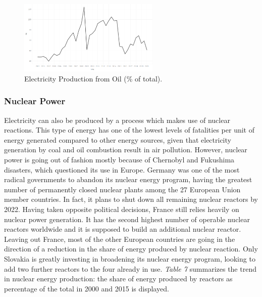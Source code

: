 \documentclass{book}
\begin{document}
\bigskip
\begin{figure}[H]
\begin{center}
\captionsetup{justification=centering}
\includegraphics[width=0.6\textwidth]{Images/oilbeh.png}
\caption{Electricity Production from Oil (\% of total). }
\end{center}
\end{figure}
\bigskip

\subsubsection*{Nuclear Power}

Electricity can also be produced by a process which makes use of nuclear reactions. This type of energy has one of the lowest levels of fatalities per unit of energy generated compared to other energy sources, given that electricity generation by coal and oil combustion result in air pollution. \cite{markandya2007electricity} However, nuclear power is going out of fashion mostly because of Chernobyl and Fukushima disasters, which questioned its use in Europe. Germany was one of the most radical governments to abandon its nuclear energy program, having the greatest number of permanently closed nuclear plants among the 27 European Union member countries. In fact, it plans to shut down all remaining nuclear reactors by 2022. Having taken opposite political decisions, France still relies heavily on nuclear power generation. It has the second highest number of operable nuclear reactors worldwide and it is supposed to build an additional nuclear reactor. Leaving out France, most of the other European countries are going in the direction of a reduction in the share of energy produced by nuclear reaction. Only Slovakia is greatly investing in broadening its nuclear energy program, looking to add two further reactors to the four already in use. \textit{Table 7} summarizes the trend in nuclear energy production: the share of energy produced by reactors as percentage of the total in 2000 and 2015 is displayed.
\end{document}
